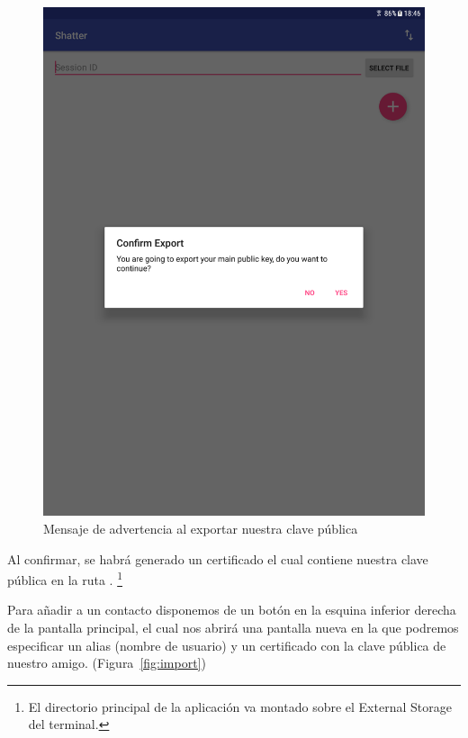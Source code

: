 \begin{figure}[ht]
  \centering
  \includegraphics[scale=0.2]{Figures/export}
  \decoRule
  \caption[Shatter (Exportar clave pública)]{Mensaje de advertencia al exportar
  nuestra clave pública}
  \label{fig:export}
\end{figure}

Al confirmar, se habrá generado un certificado el cual contiene nuestra clave
pública en la ruta . \footnote{El directorio
principal de la aplicación va montado sobre el External Storage del terminal.}

Para añadir a un contacto disponemos de un botón en la esquina inferior derecha
de la pantalla principal, el cual nos abrirá una pantalla nueva en la que
podremos especificar un alias (nombre de usuario) y un certificado con la clave
pública de nuestro amigo. (Figura~\ref{fig:import})

